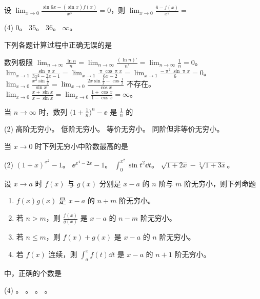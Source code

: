 \begin{ti}
	设 $\lim_{x \to 0} \frac{\sin 6x - (\sin x) f(x)}{x^3} = 0$，则 $\lim_{x \to 0} \frac{6-f(x)}{x^2} = $
	\begin{tasks}(4)
		\task $0$。
		\task $35$。
		\task $36$。
		\task $\infty$。
	\end{tasks}
\end{ti}

\begin{ti}
	下列各题计算过程中正确无误的是
	\begin{tasks}
		\task 数列极限 $\lim_{n \to \infty} \frac{\ln n}{n} = \lim_{n \to \infty} \frac{(\ln n)'}{n'} = \lim_{n \to \infty} \frac{1}{n} = 0$。
		\task $\lim_{x \to 1} \frac{\sin \uppi x}{3x^2 - 2x - 1} = \lim_{x \to 1} \frac{\uppi \cos \uppi x}{6x - 2} = \lim_{x \to 1} \frac{-\uppi^2 \sin \uppi x}{6} = 0$。
		\task $\lim_{x \to 0} \frac{x^2 \sin \frac{1}{x}}{\sin x} = \lim_{x \to 0} \frac{2x \sin \frac{1}{x} - \cos \frac{1}{x}}{\cos x}$ 不存在。
		\task $\lim_{x \to 0} \frac{x + \sin x}{x - \sin x} = \lim_{x \to 0} \frac{1 + \cos x}{1 - \cos x} = \infty$。
	\end{tasks}
\end{ti}

\begin{ti}
	当 $n \to \infty$ 时，数列 $\biggl( 1 + \frac{1}{n} \biggr)^n - \ee$ 是 $\frac1n$ 的
	\begin{tasks}(2)
		\task 高阶无穷小。
		\task 低阶无穷小。
		\task 等价无穷小。
		\task 同阶但非等价无穷小。
	\end{tasks}
\end{ti}

\begin{ti}
	当 $x \to 0$ 时下列无穷小中阶数最高的是
	\begin{tasks}(2)
		\task $(1 + x)^{x^2} - 1$。
		\task $\ee^{x^4-2x} - 1$。
		\task $\int_0^{x^2} \sin t^2 \dd{t}$。
		\task $\sqrt{1+2x} - \sqrt[3]{1+3x}$。
	\end{tasks}
\end{ti}

\begin{ti}
	设 $x \to a$ 时 $f(x)$ 与 $g(x)$ 分别是 $x-a$ 的 $n$ 阶与 $m$ 阶无穷小，则下列命题
	\begin{enumerate}
		\item $f(x) g(x)$ 是 $x-a$ 的 $n+m$ 阶无穷小。
		\item 若 $n > m$，则 $\frac{f(x)}{g(x)}$ 是 $x-a$ 的 $n-m$ 阶无穷小。
		\item 若 $n \leq m$，则 $f(x) + g(x)$ 是 $x-a$ 的 $n$ 阶无穷小。
		\item 若 $f(x)$ 连续，则 $\int_a^x f(t) \dd{t}$ 是 $x-a$ 的 $n+1$ 阶无穷小。
	\end{enumerate}
	中，正确的个数是
	\begin{tasks}(4)
		\task 1。
		\task 2。
		\task 3。
		\task 4。
	\end{tasks}
\end{ti}


